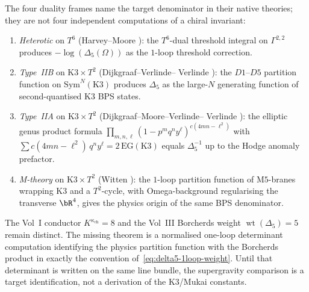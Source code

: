\begin{remark}
The four duality frames name the target denominator in their native
theories; they are not four independent computations of a chiral
invariant:
\begin{enumerate}[label=\textup{(\roman*)}]
\item \emph{Heterotic} on $T^6$ (Harvey--Moore
\cite{HarveyMoore1996}): the $T^6$-dual threshold integral on
$\Gamma^{2,2}$ produces $-\log(\Delta_5(\Omega))$ as the $1$-loop
threshold correction.
\item \emph{Type~IIB} on $\mathrm{K3} \times T^2$ (Dijkgraaf--Verlinde--
Verlinde \cite{DijkgraafVerlindeVerlinde1996,DijkgraafVerlindeVerlinde1997}):
the $D1$--$D5$ partition function on $\mathrm{Sym}^N(\mathrm{K3})$
produces $\Delta_5$ as the large-$N$ generating function of
second-quantised $\mathrm{K3}$ BPS states.
\item \emph{Type~IIA} on $\mathrm{K3} \times T^2$ (Dijkgraaf--Moore--Verlinde--
Verlinde \cite{DijkgraafMooreVerlindeVerlinde1997}): the elliptic
genus product formula
$\prod_{m, n, \ell}(1 - p^m q^n y^\ell)^{c(4mn - \ell^2)}$ with
$\sum c(4mn - \ell^2)\,q^n y^\ell = 2\,\mathrm{EG}(\mathrm{K3})$
equals $\Delta_5^{-1}$ up to the Hodge anomaly prefactor.
\item \emph{M-theory} on $\mathrm{K3} \times T^2$ (Witten
\cite{Witten1995,Kachru2017ms}): the $1$-loop partition function of
$\mathrm{M5}$-branes wrapping $\mathrm{K3}$ and a $T^2$-cycle,
with Omega-background regularising the transverse $\bR^4$, gives the
physics origin of the same BPS denominator.
\end{enumerate}
The Vol~I conductor $K^{\kappa_{\mathrm{ch}}}=8$ and the Vol~III
Borcherds weight $\operatorname{wt}(\Delta_5)=5$ remain distinct.
The missing theorem is a normalised one-loop determinant computation
identifying the physics partition function with the Borcherds
product in exactly the convention of~\eqref{eq:delta5-1loop-weight}.
Until that determinant is written on the same line bundle, the
supergravity comparison is a target identification, not a derivation
of the K3/Mukai constants.
\end{remark}

